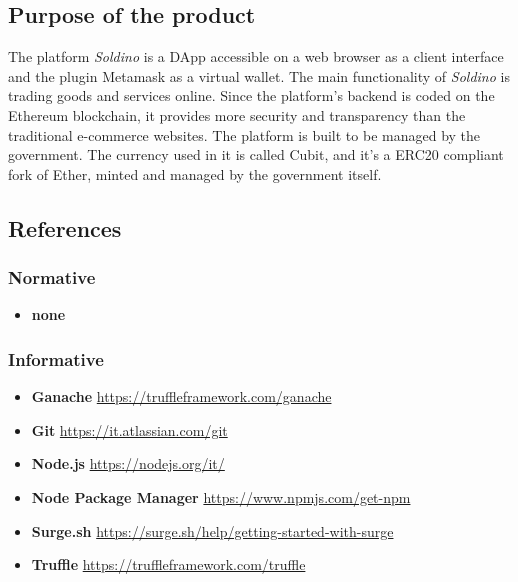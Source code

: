 \subsection{Purpose of the product}
The platform \textit{Soldino} is a DApp accessible on a web browser as a client interface and the plugin Metamask as a virtual wallet.\newline
The main functionality of \textit{Soldino} is trading goods and services online. Since the platform's backend is coded on the Ethereum blockchain, it provides more security and transparency than the traditional e-commerce websites.\newline
The platform is built to be managed by the government. The currency used in it is called Cubit, and it's a ERC20 compliant fork of Ether, minted and managed by the government itself.


\subsection{References}

\subsubsection{Normative}
\begin{itemize}
	\item \textbf{none}
\end{itemize}

\subsubsection{Informative}
\begin{itemize}
	\item \textbf{Ganache} \href{https://truffleframework.com/ganache}{https://truffleframework.com/ganache}
	\item \textbf{Git} \href{https://it.atlassian.com/git}{https://it.atlassian.com/git}
	\item \textbf{Node.js} \href{https://nodejs.org/it/}{https://nodejs.org/it/}
	\item \textbf{Node Package Manager} \href{https://www.npmjs.com/get-npm	}{https://www.npmjs.com/get-npm}
	\item \textbf{Surge.sh} \href{https://surge.sh/help/getting-started-with-surge}{https://surge.sh/help/getting-started-with-surge}
	\item \textbf{Truffle} \href{https://truffleframework.com/truffle}{https://truffleframework.com/truffle}
\end{itemize}